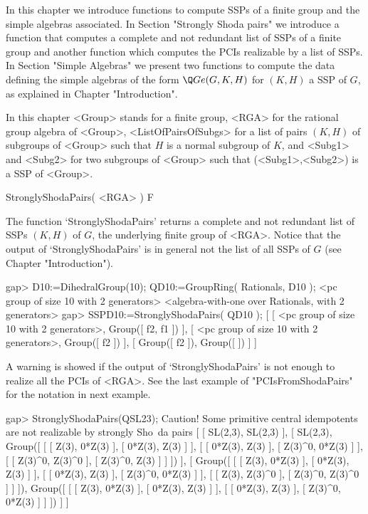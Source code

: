 
In this chapter we introduce functions to compute SSPs of a finite group and the simple 
algebras associated. In Section "Strongly Shoda pairs" we introduce a function that computes a 
complete and not redundant list of SSPs of a finite group and another function which computes 
the PCIs realizable by a list of SSPs. In Section "Simple Algebras" we present two functions 
to compute the data defining the simple algebras of the form $\Q Ge(G,K,H)$ for $(K,H)$ a SSP 
of $G$, as explained in Chapter "Introduction". 

In this chapter <Group> stands for a finite group, <RGA> for the rational group algebra of 
<Group>, <ListOfPairsOfSubgs> for a list of pairs $(K,H)$ of subgroups of <Group> such 
that $H$ is a normal subgroup of $K$, and <Subg1> and <Subg2> for two subgroups of <Group> 
such that (<Subg1>,<Subg2>) is a SSP of <Group>. 

 


\>StronglyShodaPairs( <RGA> ) F

The function `StronglyShodaPairs' returns a complete and not redundant list of SSPs $(K,H)$ of 
$G$, the underlying finite group of <RGA>. Notice that the output of `StronglyShodaPairs' is 
in general not the list of all SSPs of $G$ (see Chapter "Introduction"). 

\beginexample
    gap> D10:=DihedralGroup(10); QD10:=GroupRing( Rationals, D10 );
    <pc group of size 10 with 2 generators>
    <algebra-with-one over Rationals, with 2 generators>
    gap> SSPD10:=StronglyShodaPairs( QD10 );
    [ [ <pc group of size 10 with 2 generators>, Group([ f2, f1 ]) ],
    [ <pc group of size 10 with 2 generators>, Group([ f2 ]) ],
    [ Group([ f2 ]), Group([  ]) ] ]
\endexample

A warning is showed if the output of `StronglyShodaPairs' is not enough to realize all the 
PCIs of <RGA>. See the last example of "PCIsFromShodaPairs" for the notation in next example. 

\beginexample
    gap> StronglyShodaPairs(QSL23);
    Caution! Some primitive central idempotents are not realizable by strongly Sho\
    da pairs
    [ [ SL(2,3), SL(2,3) ],
    [ SL(2,3), Group([ [ [ Z(3), 0*Z(3) ], [ 0*Z(3), Z(3) ] ],
            [ [ 0*Z(3), Z(3) ], [ Z(3)^0, 0*Z(3) ] ],
            [ [ Z(3)^0, Z(3)^0 ], [ Z(3)^0, Z(3) ] ] ]) ],
    [ Group([ [ [ Z(3), 0*Z(3) ], [ 0*Z(3), Z(3) ] ],
            [ [ 0*Z(3), Z(3) ], [ Z(3)^0, 0*Z(3) ] ],
            [ [ Z(3), Z(3)^0 ], [ Z(3)^0, Z(3)^0 ] ] ]),
        Group([ [ [ Z(3), 0*Z(3) ], [ 0*Z(3), Z(3) ] ],
            [ [ 0*Z(3), Z(3) ], [ Z(3)^0, 0*Z(3) ] ] ]) ] ]
\endexample




